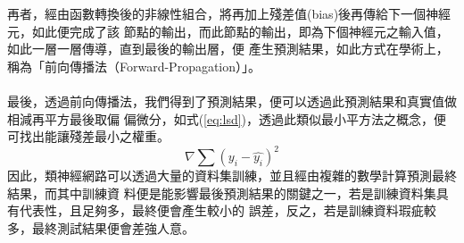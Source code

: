 		再者，經由函數轉換後的非線性組合，將再加上殘差值(bias)後再傳給下一個神經元，如此便完成了該			節點的輸出，而此節點的輸出，即為下個神經元之輸入值，如此一層一層傳導，直到最後的輸出層，便			產生預測結果，如此方式在學術上，稱為「前向傳播法（Forward-Propagation）」。
		\\
		\\		
		最後，透過前向傳播法，我們得到了預測結果，便可以透過此預測結果和真實值做相減再平方最後取偏			偏微分，如式(\ref{eq:lsd})，透過此類似最小平方法之概念，便可找出能讓殘差最小之權重。
		\begin{equation}\label{eq:lsd}
 				\nabla \sum(y_i - \hat{y_i})^2
 		\end{equation}
		因此，類神經網路可以透過大量的資料集訓練，並且經由複雜的數學計算預測最終結果，而其中訓練資			料便是能影響最後預測結果的關鍵之一，若是訓練資料集具有代表性，且足夠多，最終便會產生較小的			誤差，反之，若是訓練資料瑕疵較多，最終測試結果便會差強人意。
		\bigskip

